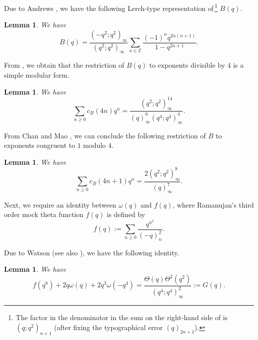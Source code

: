 \documentclass[12pt,reqno]{amsart}
\renewcommand{\o}{{\omega}}
\renewcommand{\(}{\left\(}
\renewcommand{\)}{\right\)}
\numberwithin{equation}{section}
\theoremstyle{plain}
\newtheorem{lemma}[theorem]{Lemma}
\theoremstyle{definition}
\numberwithin{equation}{section}
\begin{document}
Due to Andrews \cite[(4.3)]{A}, we have the following Lerch-type representation of\,\footnote{The factor in the denominator in the sum on the right-hand side of \cite[(4.3)]{A} is $(q;q^2)_{n+1}$ (after fixing the typographical error $(q)_{2n+1}$).} $B(q)$. %

\begin{lemma}\label{And}
	We have %
	\[
	B(q)=\frac{\left(-q^2;q^2\right)_{\infty}}{\left(q^2;q^2\right)_{\infty}}\sum_{n\in \mathbb{Z}}\frac{(-1)^n q^{2n(n+1)}}{1-q^{2n+1}}.
	\]
\end{lemma} 

From \cite[(4.1)]{Mao}, we obtain that the restriction of $B(q)$ to exponents divisible by $4$ is a simple modular form.
\begin{lemma}\label{Mao}
	We have
	\[
	\sum_{n\ge 0}c_B(4n)q^n=\frac{\left(q^{2};q^2\right)^{14}_{\infty}}{(q)^9_{\infty} \left(q^4;q^4\right)^4_{\infty}}.
	\]
\end{lemma}

From Chan and Mao \cite[(2.13)]{CM}, we can conclude the following restriction of $B$ to exponents congruent to $1$ modulo $4$.
\begin{lemma}\label{CM}
	We have 
	\[
	\sum_{n\ge 0}c_B(4n+1)q^n%
	=\frac{2\left(q^2;q^2\right)^8_{\infty}}{(q)^7_{\infty}}. %
	\]
\end{lemma}




 Next, we require an identity between $\o(q)$ and $f(q)$, where Ramanujan's third order mock theta function $f(q)$ is defined by
\begin{equation*}%
f(q):=\sum_{n\ge0}\frac{q^{n^2}}{\left(-q\right)^2_{n}}.
\end{equation*}

Due to Watson \cite[p. 66]{W} (see also \cite[(4)]{APSY}), we have the following identity. 
\begin{lemma}\label{odissection}
We have %
\[
f\!\left(q^8\right)+2q\o(q)+2q^3\o\!\left(-q^4\right)=\frac{\Theta(q)\Theta^2\left(q^2\right)}{\left(q^4;q^4\right)^2_{\infty}}:=G(q).
\]
\end{lemma}
\end{document}
